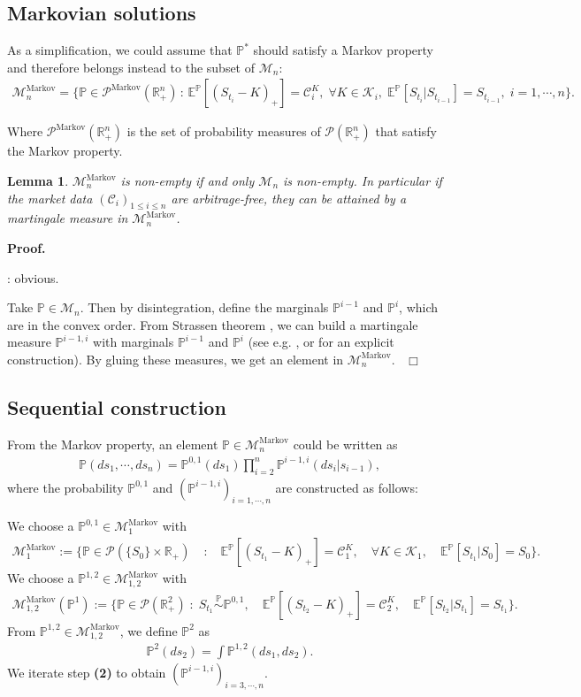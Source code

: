 \documentclass{amsart}%
\def \R{\mathbb{R}}
\def\Cc{{\cal C}}
\def\Pc{{\cal P}}
\def\no{\noindent}
\def\x{\times}
\def \ep{\hbox{ }\hfill{ ${\cal t}$~\hspace{-5.1mm}~${\cal u}$   } }
\def \proof{{\noindent \bf Proof. }}
\def \ep{\hbox{ }\hfill$\Box$}
\newtheorem{lem}[thm]{Lemma}
\theoremstyle{definition}
\theoremstyle{remark}
\newcommand{\PP}{\mathbb{P}}
\newcommand{\beaa}{\begin{eqnarray*}}
\newcommand{\eeaa}{\end{eqnarray*}}
\newcommand{\EE}{{\mathbb E}}
\newcommand{\cal}{\mathcal}
\begin{document}
\subsection*{Markovian solutions}
\no As a simplification, we could assume that $\PP^*$ should satisfy a  Markov  property and therefore belongs instead to the subset of  ${\cal M}_n$:
\beaa {\cal M}^\mathrm{Markov}_n=\{\PP\in\Pc^\mathrm{Markov} (\R^n_+)\,:\,  \EE^\PP[(S_{t_i}-K)_+]=\Cc_i^K, \; \forall K \in {\cal K}_i,  \;
\EE^\PP[S_{t_i}|S_{t_{i-1}}]=S_{t_{i-1}}, \; i=1, \cdots ,n \}. \eeaa

\no Where $\Pc^\mathrm{Markov}(\R^n_+)$ is the set of probability measures of $\Pc(\R^n_+)$ that satisfy the Markov property.

\begin{lem} ${\cal M}^\mathrm{Markov}_n$ is non-empty if and only ${\cal M}_n$ is non-empty. In particular if the market data $( {\cal C}_i)_{1 \leq i \leq n}$ are arbitrage-free, they can be attained by a martingale measure in ${\cal M}^\mathrm{Markov}_n$.
\end{lem}
\proof
\no

\no {\bf $\Longrightarrow$}: obvious.

\no {\bf $\Longleftarrow$} Take $\PP \in {\cal M}_n$.  Then by disintegration, define the marginals $\PP^{i-1}$ and $\PP^{i}$, which are in the convex order. From Strassen theorem \cite{strassen1965existence}, we can build a martingale measure  $\PP^{i-1,i}$ with marginals $\PP^{i-1}$ and $\PP^{i}$ (see e.g. \cite{henry2013explicit}, or \cite{kallblad2017optimal} for an explicit construction).  By gluing these measures, we get an element in
${\cal M}^\mathrm{Markov}_n$.
\ep


\subsection{Sequential construction}\label{subsect:sequential_build}

\no From the Markov property, an element $\PP \in {\cal M}^\mathrm{Markov}_n$ could be written as
\beaa \PP(ds_1, \cdots,ds_n)=\PP^{0,1}(ds_1) \prod_{i=2}^n \PP^{i-1,i}(ds_i|s_{i-1}), \eeaa
where the probability $\PP^{0,1} $ and $(\PP^{i-1,i})_{i=1,\cdots,n}$ are constructed as follows:

\no {\bf (1)} We choose a $\PP^{0,1}  \in {\cal M}^\mathrm{Markov}_1$ with
\beaa {\cal M}^\mathrm{Markov}_1:=\{\PP\in\Pc (\{S_0\}\x\R_+) \; &:& \;  \EE^\PP[(S_{t_1}-K)_+]=\Cc_1^K, \quad \forall K \in {\cal K}_1,  \quad
\EE^\PP[S_{t_1}|S_0]=S_{0} \}. \eeaa
\no {\bf (2)} We choose a $\PP^{1,2} \in  {\cal M}^\mathrm{Markov}_{1,2}$ with \beaa {\cal M}^\mathrm{Markov}_{1,2}(\PP^{1}):=\{\PP\in\Pc (\R^2_+) \;:\; S_{t_{1}} \overset{\PP}{\sim} \PP^{0,1}, \quad \EE^\PP[(S_{t_2}-K)_+]=\Cc_2^K, \quad
\EE^\PP[S_{t_2}|S_{t_{1}}]=S_{t_{1}} \}. \eeaa From $\PP^{1,2} \in  {\cal M}^\mathrm{Markov}_{1,2}$, we define $\PP^2$ as
 \beaa \PP^2(ds_2)=\int \PP^{1,2}(ds_1,ds_2). \eeaa
 \no {\bf (3)}  We iterate step {\bf (2)} to obtain  $(\PP^{i-1,i})_{i=3,\cdots,n}$.
 
\end{document}

